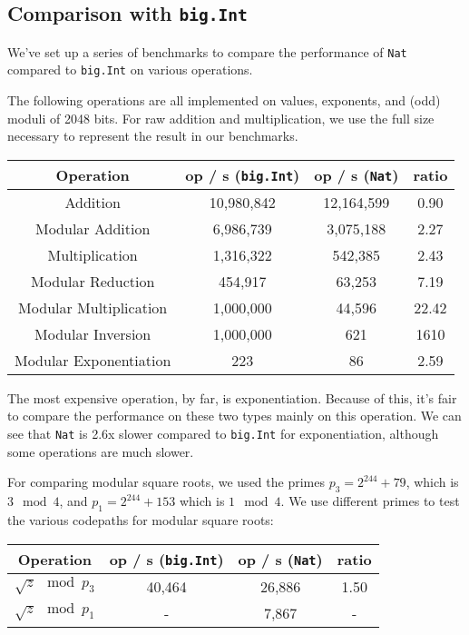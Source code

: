 \documentclass[11pt, a4paper]{article} %
\begin{document}
{\subsection{Comparison with \texttt{big.Int}}

We've set up a series of benchmarks to compare the performance
of \texttt{Nat} compared to \texttt{big.Int} on various operations.

The following operations are all implemented on values, exponents,
and (odd) moduli of 2048 bits. For raw addition and multiplication,
we use the full size necessary to represent the result in our benchmarks.

\begin{center}
 \begin{tabular}{|c | c | c | c|} 
 \hline
 Operation & op / s (\texttt{big.Int}) & op / s (\texttt{Nat}) & ratio \\ [0.5ex] 
 \hline\hline
 Addition & 10,980,842 & 12,164,599 & 0.90 \\
 \hline
 Modular Addition & 6,986,739 & 3,075,188 & 2.27 \\
 \hline
 Multiplication & 1,316,322 & 542,385 & 2.43 \\
 \hline
 Modular Reduction & 454,917 & 63,253 & 7.19 \\
 \hline
 Modular Multiplication & 1,000,000 & 44,596 & 22.42 \\
 \hline
 Modular Inversion & 1,000,000 & 621 & 1610 \\
 \hline
 Modular Exponentiation & 223 & 86 & 2.59 \\
 \hline
\end{tabular}
\end{center}

The most expensive operation, by far, is exponentiation. Because
of this, it's fair to compare the performance on these two types
mainly on this operation. We can see that \texttt{Nat} is 2.6x slower
compared to \texttt{big.Int} for exponentiation, although
some operations are much slower.

For comparing modular square roots, we used the primes
$p_3 = 2^{244} + 79$, which is $3 \mod 4$,
and $p_1 = 2^{244} + 153$ which is $1 \mod 4$. We use different primes
to test the various codepaths for modular square roots:

\begin{center}
 \begin{tabular}{|c | c | c | c|} 
 \hline
 Operation & op / s (\texttt{big.Int}) & op / s (\texttt{Nat}) & ratio \\ [0.5ex] 
 \hline\hline
 $\sqrt{z} \mod p_3$ & 40,464 & 26,886 & 1.50 \\
 \hline
 $\sqrt{z} \mod p_1$ & - & 7,867 & - \\
 \hline
\end{tabular}
\end{center}

}
\end{document}
